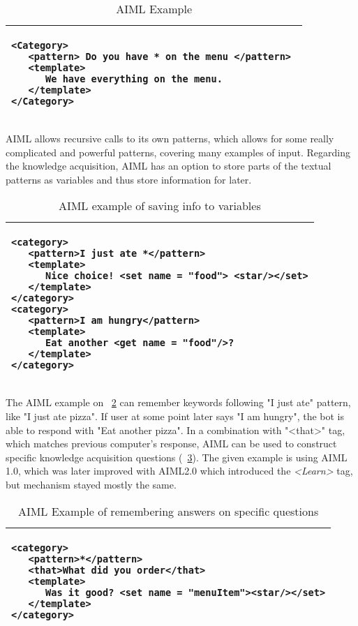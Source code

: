 \begin{table}[htb]
\caption{AIML Example}
\label{tab:aiml_example}
\centering
\begin{tabular}{l}
\hline
\lstset{language=XML,breaklines=true}
\begin{lstlisting}
<Category> 
   <pattern> Do you have * on the menu </pattern> 
   <template>
      We have everything on the menu.
   </template> 
</Category>
\end{lstlisting}  \\
\hline
\end{tabular}
\end{table}

AIML allows recursive calls to its own patterns, which allows for some really 
complicated
and powerful patterns, covering many examples of input. Regarding the knowledge 
acquisition,
AIML has an option to store parts of the textual patterns as variables and thus 
store 
information for later. 

\begin{table}[htb]
	\caption{AIML example of saving info to variables}
	\label{tab:aiml_ka1}
	\centering
	\begin{tabular}{l}
		\hline
		\lstset{language=XML,breaklines=true}
		\begin{lstlisting}
<category>
   <pattern>I just ate *</pattern>
   <template>
      Nice choice! <set name = "food"> <star/></set>
   </template>  
</category>  
<category>
   <pattern>I am hungry</pattern>
   <template>
      Eat another <get name = "food"/>?
   </template>  
</category> 
		\end{lstlisting}  \\
		\hline
	\end{tabular}
\end{table}

The AIML example on \tablename~\ref{tab:aiml_ka1} can remember keywords
following "I just ate" pattern, like "I just ate pizza". If user at some point 
later says "I am hungry", the bot is able to respond with "Eat another pizza". 
In a combination with "<that>" tag, which matches previous computer's response, 
AIML can be used to construct specific knowledge acquisition questions 
(\tablename~\ref{tab:aiml_ka2}).  The given example is using AIML 1.0, which
was later improved with AIML2.0\parencite{Wallace2013} which introduced the
\emph{<Learn>} tag, but mechanism stayed mostly the same.

\begin{table}[htb]
	\caption{AIML Example of remembering answers on specific questions}
	\label{tab:aiml_ka2}
	\centering
	\begin{tabular}{l}
		\hline
		\lstset{language=XML,breaklines=true}
		\begin{lstlisting}
<category>
   <pattern>*</pattern>
   <that>What did you order</that>
   <template> 
      Was it good? <set name = "menuItem"><star/></set>
   </template>  
</category>  
		\end{lstlisting}  \\
		\hline
	\end{tabular}
\end{table}

